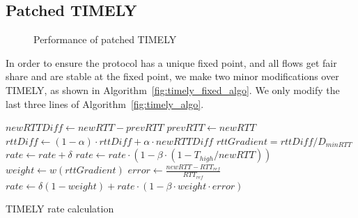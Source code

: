 \subsection {Patched TIMELY}


\begin{figure}[t]
\center
{}
\caption{Performance of patched TIMELY}
\label{fig:timely_fixed}
\end{figure}

In order to ensure the protocol has a unique fixed point, and all flows get fair
share and are stable at the fixed point, we make two minor modifications over
TIMELY, as shown in Algorithm~\ref{fig:timely_fixed_algo}. We only modify the
last three lines of Algorithm~\ref{fig:timely_algo}.

\begin{algorithm}[t]
\footnotesize
{
\begin{algorithmic}[1]
\State $newRTTDiff \gets newRTT - prevRTT$
\State $prevRTT \gets newRTT$
\State $rttDiff \gets (1-\alpha) \cdot rttDiff + \alpha \cdot newRTTDiff$
\State $rttGradient = rttDiff/D_{minRTT}$
        \State $rate \gets rate + \delta$
        \State $rate \gets rate \cdot  (1 - \beta \cdot (1 - T_{high}/newRTT))$
\Else
		\State $weight \gets w(rttGradient)$	
		\State $error \gets \frac{{newRTT - RT{T_{ref}}}}{{RT{T_{ref}}}}$
        \State $rate \gets \delta (1-weight) +  rate \cdot (1 - \beta \cdot weight  \cdot error)$
\EndIf 
\end{algorithmic}
}
\caption{TIMELY rate calculation}
\label{fig:timely_fixed_algo}
\end{algorithm}

